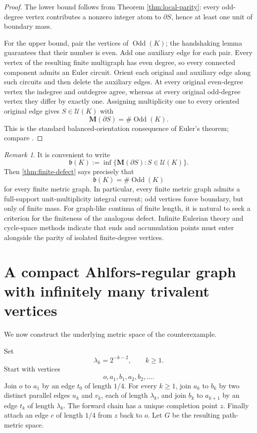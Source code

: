\documentclass[11pt]{article}
\theoremstyle{remark}
\newtheorem{remark}[theorem]{Remark}
\newcommand{\M}{\mathbf M}
\newcommand{\Odd}{\operatorname{Odd}}
\begin{document}
\begin{proof}
The lower bound follows from Theorem \ref{thm:local-parity}: every odd-degree vertex contributes a nonzero integer atom to $\partial S$, hence at least one unit of boundary mass.

For the upper bound, pair the vertices of $\Odd(K)$; the handshaking lemma guarantees that their number is even. Add one auxiliary edge for each pair. Every vertex of the resulting finite multigraph has even degree, so every connected component admits an Euler circuit. Orient each original and auxiliary edge along such circuits and then delete the auxiliary edges. At every original even-degree vertex the indegree and outdegree agree, whereas at every original odd-degree vertex they differ by exactly one. Assigning multiplicity one to every oriented original edge gives $S\in\mathscr U(K)$ with
\[
   \M(\partial S)=\#\Odd(K).
\]
This is the standard balanced-orientation consequence of Euler's theorem; compare \cite{Diestel17}.
\end{proof}

\begin{remark}\label{rem:finite-positive}
It is convenient to write
\[
   \mathfrak b(K)
   :=\inf\{\M(\partial S):S\in\mathscr U(K)\}.
\]
Then \cref{thm:finite-defect} says precisely that
\[
   \mathfrak b(K)=\#\Odd(K)
\]
for every finite metric graph. In particular, every finite metric graph admits a full-support unit-multiplicity integral current; odd vertices force boundary, but only of finite mass. For graph-like continua of finite length, it is natural to seek a criterion for the finiteness of the analogous defect. Infinite Eulerian theory and cycle-space methods \cite{ThomassenVella08,Richter11,Georgakopoulos12,Georgakopoulos14,EspinozaGartsidePitz20,GartsidePitz23} indicate that ends and accumulation points must enter alongside the parity of isolated finite-degree vertices.
\end{remark}

\section{A compact Ahlfors-regular graph with infinitely many trivalent vertices}\label{sec:graph}

We now construct the underlying metric space of the counterexample.

Set
\[
   \lambda_k=2^{-k-2},\qquad k\ge1.
\]
Start with vertices
\[
   o,a_1,b_1,a_2,b_2,\ldots.
\]
Join $o$ to $a_1$ by an edge $t_0$ of length $1/4$. For every $k\ge1$, join $a_k$ to $b_k$ by two distinct parallel edges $u_k$ and $v_k$, each of length $\lambda_k$, and join $b_k$ to $a_{k+1}$ by an edge $t_k$ of length $\lambda_k$. The forward chain has a unique completion point $z$. Finally attach an edge $c$ of length $1/4$ from $z$ back to $o$. Let $G$ be the resulting path-metric space.
\end{document}
